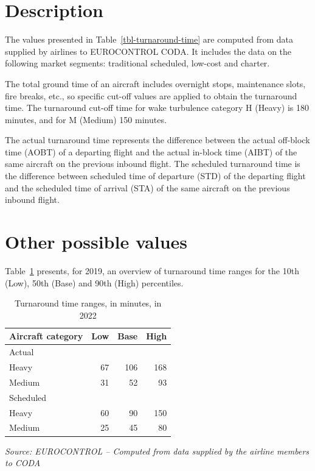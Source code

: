 \documentclass[
  11pt,
  a4paper,
]{book}
\begin{document}
\hypertarget{description-6}{%
\section{Description}\label{description-6}}

The values presented in Table~\ref{tbl-turnaround-time} are computed
from data supplied by airlines to EUROCONTROL CODA. It includes the data
on the following market segments: traditional scheduled, low-cost and
charter.

The total ground time of an aircraft includes overnight stops,
maintenance slots, fire breaks, etc., so specific cut-off values are
applied to obtain the turnaround time. The turnaround cut-off time for
wake turbulence category H (Heavy) is 180 minutes, and for M (Medium)
150 minutes.

The actual turnaround time represents the difference between the actual
off-block time (AOBT) of a departing flight and the actual in-block time
(AIBT) of the same aircraft on the previous inbound flight. The
scheduled turnaround time is the difference between scheduled time of
departure (STD) of the departing flight and the scheduled time of
arrival (STA) of the same aircraft on the previous inbound flight.

\hypertarget{other-possible-values-2}{%
\section{Other possible values}\label{other-possible-values-2}}

Table~\ref{tbl-turnaround-time-range} presents, for 2019, an overview of
turnaround time ranges for the 10th (Low), 50th (Base) and 90th (High)
percentiles.

\hypertarget{tbl-turnaround-time-range}{}
\setlength{\LTpost}{0mm}
\begin{longtable}{lrrr}
\caption{\label{tbl-turnaround-time-range}Turnaround time ranges, in minutes, in 2022 }\tabularnewline

\toprule
Aircraft category & Low & Base & High \\ 
\midrule
\multicolumn{4}{l}{Actual} \\ 
\midrule
Heavy & 67 & 106 & 168 \\ 
Medium & 31 & 52 & 93 \\ 
\midrule
\multicolumn{4}{l}{Scheduled} \\ 
\midrule
Heavy & 60 & 90 & 150 \\ 
Medium & 25 & 45 & 80 \\ 
\bottomrule
\end{longtable}
\begin{minipage}{\linewidth}
\emph{Source: EUROCONTROL -- Computed from data supplied by the airline members to CODA}\\
\end{minipage}
\end{document}
